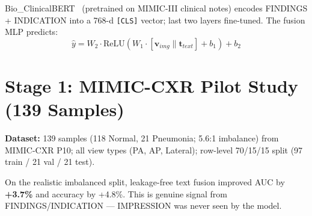 \documentclass{article}
\begin{document}
\vspace{-2pt}
Bio\_ClinicalBERT~\cite{alsentzer2019bert} (pretrained on MIMIC-III clinical
notes) encodes FINDINGS + INDICATION into a 768-d \texttt{[CLS]} vector;
last two layers fine-tuned. The fusion MLP predicts:
\vspace{-3pt}
\begin{equation}
  \hat{y}=W_2\cdot\text{ReLU}(W_1\cdot[\mathbf{v}_{img}\|\mathbf{t}_{text}]+b_1)+b_2
  \label{eq:fusion}
\end{equation}

\section{Stage 1: MIMIC-CXR Pilot Study (139 Samples)}

\textbf{Dataset:} 139 samples (118 Normal, 21 Pneumonia; 5.6:1 imbalance) from
MIMIC-CXR P10; all view types (PA, AP, Lateral); row-level 70/15/15 split
(97 train / 21 val / 21 test).

\begin{table}[h]
\centering
\caption{Pilot results (139 samples, ResNet50+DSC+GCSA).}
\label{tab:pilot}
\end{table}

On the realistic imbalanced split, leakage-free text fusion improved AUC
by \textbf{+3.7\%} and accuracy by +4.8\%. This is genuine signal from
FINDINGS/INDICATION --- IMPRESSION was never seen by the model.
\end{document}
